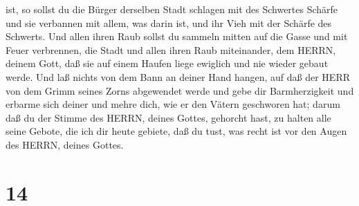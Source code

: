 ist,  so sollst du die Bürger derselben Stadt schlagen mit
des Schwertes Schärfe und sie verbannen mit allem, was darin ist, und
ihr Vieh mit der Schärfe des Schwerts.  Und allen ihren
Raub sollst du sammeln mitten auf die Gasse und mit Feuer verbrennen,
die Stadt und allen ihren Raub miteinander, dem HERRN, deinem Gott, daß
sie auf einem Haufen liege ewiglich und nie wieder gebaut werde.
 Und laß nichts von dem Bann an deiner Hand hangen, auf daß
der HERR von dem Grimm seines Zorns abgewendet werde und gebe dir
Barmherzigkeit und erbarme sich deiner und mehre dich, wie er den Vätern
geschworen hat;  darum daß du der Stimme des HERRN, deines
Gottes, gehorcht hast, zu halten alle seine Gebote, die ich dir heute
gebiete, daß du tust, was recht ist vor den Augen des HERRN, deines
Gottes.

\hypertarget{section-13}{%
\section{14}\label{section-13}}

